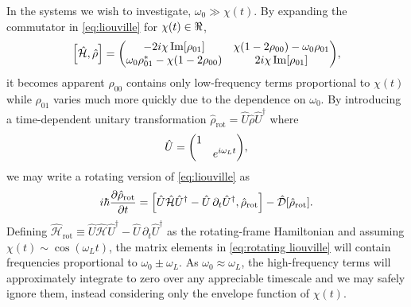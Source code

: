 \documentclass[conference]{IEEEtran}
\begin{document}
In the systems we wish to investigate, $\omega_0 \gg \chi(t)$. By expanding the commutator in \cref{eq:liouville} for $\chi(t) \in \real$,
\begin{equation}
  \commutator{\hat{\mathcal{H}}}{\hat{\rho}} =
  \mqty(
    -2 i \chi \Im[\rho_{01}] & \chi\qty(1 - 2 \rho_{00}) - \omega_0 \rho_{01} \\ 
    \omega_0 \rho_{01}^* - \chi\qty(1 - 2\rho_{00}) & 2 i \chi \Im[\rho_{01}]
  ),
\end{equation}
it becomes apparent $\rho_{00}$ contains only low-frequency terms proportional to $\chi(t)$ while $\rho_{01}$ varies much more quickly due to the dependence on $\omega_0$.
By introducing a time-dependent unitary transformation $\hat{\rho}_\text{rot} = \hat{U}\hat{\rho}\hat{U}^\dagger$ where
\begin{equation}
  \hat{U} = \mqty(\dmat{1, e^{i \omega_L t}}), 
  \label{eq:unitary transformation}
\end{equation}
we may write a rotating version of \cref{eq:liouville} as
\begin{equation}
  i \hbar \pdv{\hat{\rho}_\text{rot}}{t} = \commutator{\hat{U} \hat{\mathcal{H}} \hat{U}^\dagger - \hat{U} \, \partial_t \hat{U}^\dagger}{\hat{\rho}_\text{rot}} - \hat{\mathcal{D}}[\hat{\rho}_\text{rot}].
  \label{eq:rotating liouville}
\end{equation}
Defining $\hat{\mathcal{H}}_\text{rot} \equiv \hat{U} \hat{\mathcal{H}} \hat{U}^\dagger - \hat{U} \, \partial_t \hat{U}^\dagger$ as the rotating-frame Hamiltonian and assuming $\chi(t) \sim \cos(\omega_L t)$, the matrix elements in \cref{eq:rotating liouville} will contain frequencies proportional to $\omega_0 \pm \omega_L$.
As $\omega_0 \approx \omega_L$, the high-frequency terms will approximately integrate to zero over any appreciable timescale and we may safely ignore them, instead considering only the envelope function of $\chi(t)$.
\end{document}

